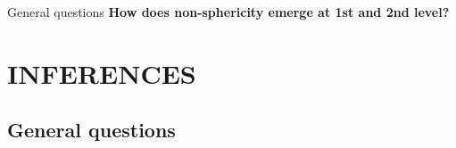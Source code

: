 \documentclass{beamer}
\begin{document}
% 
%     
% 
% 


\begin{frame}{General questions}
\textbf{How does non-sphericity emerge at 1st and 2nd level?}

\end{frame}





\section{INFERENCES}

\subsection[General questions]{General questions}
\end{document}
